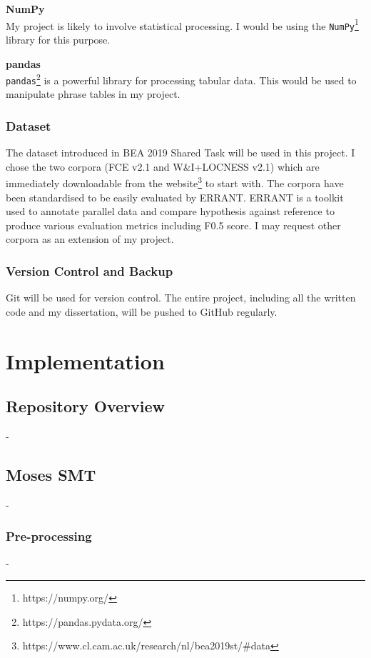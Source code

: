 \documentclass[12pt,a4paper,twoside,openright]{report}
\begin{document}
\textbf{NumPy} \\
My project is likely to involve statistical processing. I would be using the \texttt{NumPy}\footnote{https://numpy.org/} library for this purpose.

\textbf{pandas} \\
\texttt{pandas}\footnote{https://pandas.pydata.org/} is a powerful library for processing tabular data. This would be used to manipulate phrase tables in my project.

\subsection{Dataset}
The dataset introduced in BEA 2019 Shared Task\cite{bryant-etal-2019-bea} will be used in this project. I chose the two corpora (FCE v2.1 and W\&I+LOCNESS v2.1) which are immediately downloadable from the website\footnote{https://www.cl.cam.ac.uk/research/nl/bea2019st/\#data} to start with. The corpora have been standardised to be easily evaluated by ERRANT\cite{bryant-etal-2017-automatic,felice-etal-2016-automatic}. ERRANT is a toolkit used to annotate parallel data and compare hypothesis against reference to produce various evaluation metrics including F0.5 score. I may request other corpora as an extension of my project.

\subsection{Version Control and Backup}
Git will be used for version control. The entire project, including all the written code and my dissertation, will be pushed to GitHub regularly.

\chapter{Implementation}

\section{Repository Overview}
-

\section{Moses SMT}
-

\subsection{Pre-processing}
-
\end{document}
